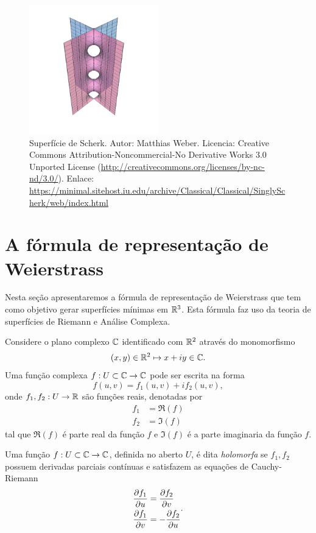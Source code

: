 \begin{figure}
	\centering
	\includegraphics[width=0.5\textwidth]{images/scherk}
	\caption{Superfície de Scherk. Autor: Matthias Weber. Licencia: Creative Commons Attribution-Noncommercial-No Derivative Works 3.0 Unported License (\url{http://creativecommons.org/licenses/by-nc-nd/3.0/}). Enlace: \url{https://minimal.sitehost.iu.edu/archive/Classical/Classical/SinglyScherk/web/index.html}}
\end{figure}

\section{A fórmula de representação de Weierstrass}
Nesta seção apresentaremos a fórmula de representação de Weierstrass que tem como objetivo gerar superfícies mínimas em $\mathbb{R}^3$. Esta fórmula faz uso da teoria de superfícies de Riemann e Análise Complexa.

Considere o plano complexo $\mathbb{C}$ identificado com $\mathbb{R}^2$ através do monomorfismo
\begin{equation*}
(x,y) \in \mathbb{R}^2 \mapsto x + iy \in \mathbb{C}.
\end{equation*}
Uma função complexa $f: U \subset \mathbb{C} \rightarrow \mathbb{C}$ pode ser escrita na forma
\begin{equation*}
f(u,v) = f_1(u,v) + i f_2(u,v),
\end{equation*}
onde $f_1, f_2: U \rightarrow \mathbb{R}$ são funções reais, denotadas por
\begin{align*}
f_1 &= \Re(f)\\
f_2 &= \Im(f)
\end{align*}
tal que $\Re(f)$ é parte real da função $f$ e $\Im(f)$ é a parte imaginaria da função $f$.
\begin{definicao}
	Uma função $f: U \subset \mathbb{C} \rightarrow \mathbb{C}$, definida no aberto $U$, é dita \emph{holomorfa} se $f_1, f_2$ possuem derivadas parciais contínuas e satisfazem as equações de Cauchy-Riemann
	\begin{equation*}
		\begin{split}
		\frac{\partial f_1}{\partial u} &= \frac{\partial f_2}{\partial v}\\
		\frac{\partial f_1}{\partial v} &= - \frac{\partial f_2}{\partial u}
		\end{split}.
	\end{equation*}

\end{definicao}

